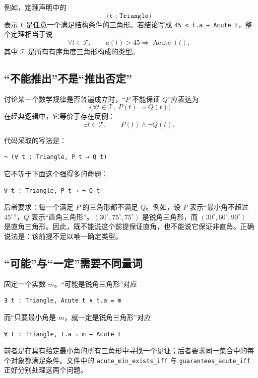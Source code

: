 \documentclass[UTF8,a4paper,zihao=-4,oneside,openany,fontset=fandol]{ctexbook}
\theoremstyle{definition}
\theoremstyle{remark}
\begin{document}
例如，定理声明中的
\[
\texttt{(t : Triangle)}
\]
表示 \texttt{t} 是任意一个满足结构条件的三角形。若结论写成 \texttt{45 < t.a → Acute t}，整个定理相当于说
\[
\forall t\in\mathcal T,\qquad a(t)>45\Longrightarrow \operatorname{Acute}(t),
\]
其中 $\mathcal T$ 是所有有序角度三角形构成的类型。

\subsection{“不能推出”不是“推出否定”}

讨论某一个数学规律是否普遍成立时，“$P$ 不能保证 $Q$”应表达为
\[
\neg\bigl(\forall t\in\mathcal T,\ P(t)\Rightarrow Q(t)\bigr).
\]
在经典逻辑中，它等价于存在反例：
\[
\exists t\in\mathcal T,\qquad P(t)\land\neg Q(t).
\]

代码采取的写法是：
\begin{Verbatim}[fontsize=\small,breaklines=true]
¬ (∀ t : Triangle, P t → Q t)
\end{Verbatim}

它不等于下面这个强得多的命题：
\begin{Verbatim}[fontsize=\small,breaklines=true]
∀ t : Triangle, P t → ¬ Q t
\end{Verbatim}

后者要求：每一个满足 $P$ 的三角形都不满足 $Q$。例如，设 $P$ 表示“最小角不超过 $45^\circ$”，$Q$ 表示“直角三角形”。$(30^\circ,75^\circ,75^\circ)$ 是锐角三角形，而 $(30^\circ,60^\circ,90^\circ)$ 是直角三角形。因此，既不能说这个前提保证直角，也不能说它保证非直角。正确说法是：该前提不足以唯一确定类型。

\subsection{“可能”与“一定”需要不同量词}

固定一个实数 $m$。“可能是锐角三角形”对应
\begin{Verbatim}[fontsize=\small,breaklines=true]
∃ t : Triangle, Acute t ∧ t.a = m
\end{Verbatim}
而“只要最小角是 $m$，就一定是锐角三角形”对应
\begin{Verbatim}[fontsize=\small,breaklines=true]
∀ t : Triangle, t.a = m → Acute t
\end{Verbatim}

前者是在具有给定最小角的所有三角形中寻找一个见证；后者要求同一集合中的每个对象都满足条件。文件中的 \texttt{acute\_min\_exists\_iff} 与 \texttt{guarantees\_acute\_iff} 正好分别处理这两个问题。
\end{document}
